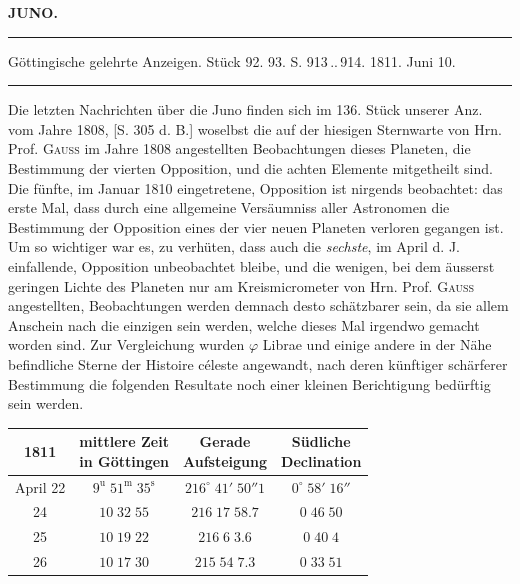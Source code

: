 \clearpage{}\hypertarget{native-330-lower}{}\label{native-330-lower}
\begin{center}\textbf{JUNO.}\par\vspace{4pt}\hrule\vspace{4pt}\fontsize{10}{12}\selectfont Göttingische gelehrte Anzeigen. Stück 92. 93. S. 913\,..\,914. 1811. Juni 10.\par\vspace{4pt}\hrule\vspace{4pt}\end{center}

\par\indent Die letzten Nachrichten über die Juno finden sich im 136. Stück unserer Anz. vom Jahre 1808, [S. 305 d. B.] woselbst die auf der hiesigen Sternwarte von Hrn. Prof. \textsc{Gauss} im Jahre 1808 angestellten Beobachtungen dieses Planeten, die Bestimmung der vierten Opposition, und die achten Elemente mitgetheilt sind. Die fünfte, im Januar 1810 eingetretene, Opposition ist nirgends beobachtet: das erste Mal, dass durch eine allgemeine Versäumniss aller Astronomen die Bestimmung der Opposition eines der vier neuen Planeten verloren gegangen ist. Um so wichtiger war es, zu verhüten, dass auch die \emph{sechste}, im April d. J. einfallende,  Opposition unbeobachtet bleibe, und die wenigen, bei dem äusserst geringen Lichte des Planeten nur am Kreismicrometer von Hrn. Prof. \textsc{Gauss} angestellten, Beobachtungen werden demnach desto schätzbarer sein, da sie allem Anschein nach die einzigen sein werden, welche dieses Mal irgendwo gemacht worden sind. Zur Vergleichung wurden $\varphi$ Librae und einige andere in der Nähe befindliche Sterne der Histoire céleste angewandt, nach deren künftiger schärferer Bestimmung die folgenden Resultate noch einer kleinen Berichtigung bedürftig sein werden.
\begin{center}\fontsize{10}{12}\selectfont\setlength{\tabcolsep}{4pt}\renewcommand{\arraystretch}{1.15}\begin{tabular}{c|c|c|c}
1811 & \shortstack{mittlere Zeit\\in Göttingen} & \shortstack{Gerade\\Aufsteigung} & \shortstack{Südliche\\Declination}\\\hline
April 22 & $9^{\text{u}}\;51^{\text{m}}\;35^{\text{s}}$ & $216^\circ\;41'\;50''1$ & $0^\circ\;58'\;16''$\\
24 & $10\;32\;55$ & $216\;17\;58.7$ & $0\;46\;50$\\
25 & $10\;19\;22$ & $216\;6\;3.6$ & $0\;40\;4$\\
26 & $10\;17\;30$ & $215\;54\;7.3$ & $0\;33\;51$\\
\end{tabular}\end{center}

